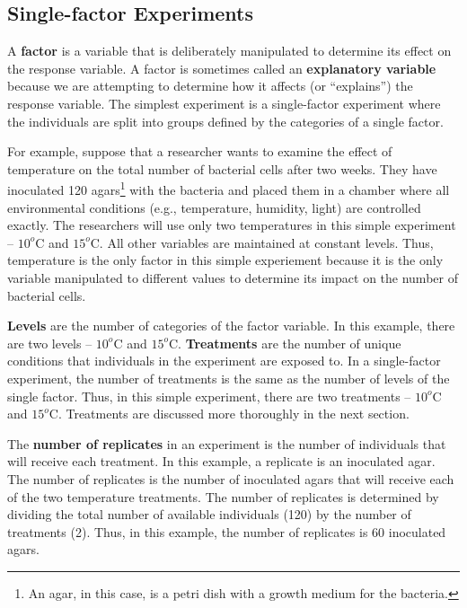 \documentclass[10pt,openany]{book}\usepackage[]{graphicx}\usepackage[]{color}
\begin{document}
\subsection{Single-factor Experiments}
A \textbf{factor} is a variable that is deliberately manipulated to determine its effect on the response variable. A factor is sometimes called an \textbf{explanatory variable} because we are attempting to determine how it affects (or ``explains'') the response variable. The simplest experiment is a single-factor experiment where the individuals are split into groups defined by the categories of a single factor.

For example, suppose that a researcher wants to examine the effect of temperature on the total number of bacterial cells after two weeks. They have inoculated 120 agars\footnote{An agar, in this case, is a petri dish with a growth medium for the bacteria.} with the bacteria and placed them in a chamber where all environmental conditions (e.g., temperature, humidity, light) are controlled exactly. The researchers will use only two temperatures in this simple experiment -- $10^{o}$C and $15^{o}$C. All other variables are maintained at constant levels. Thus, temperature is the only factor in this simple experiement because it is the only variable manipulated to different values to determine its impact on the number of bacterial cells.


\textbf{Levels} are the number of categories of the factor variable. In this example, there are two levels -- $10^{o}$C and $15^{o}$C. \textbf{Treatments} are the number of unique conditions that individuals in the experiment are exposed to. In a single-factor experiment, the number of treatments is the same as the number of levels of the single factor. Thus, in this simple experiment, there are two treatments -- $10^{o}$C and $15^{o}$C. Treatments are discussed more thoroughly in the next section.

The \textbf{number of replicates} in an experiment is the number of individuals that will receive each treatment. In this example, a replicate is an inoculated agar. The number of replicates is the number of inoculated agars that will receive each of the two temperature treatments. The number of replicates is determined by dividing the total number of available individuals (120) by the number of treatments (2). Thus, in this example, the number of replicates is 60 inoculated agars.
\end{document}
